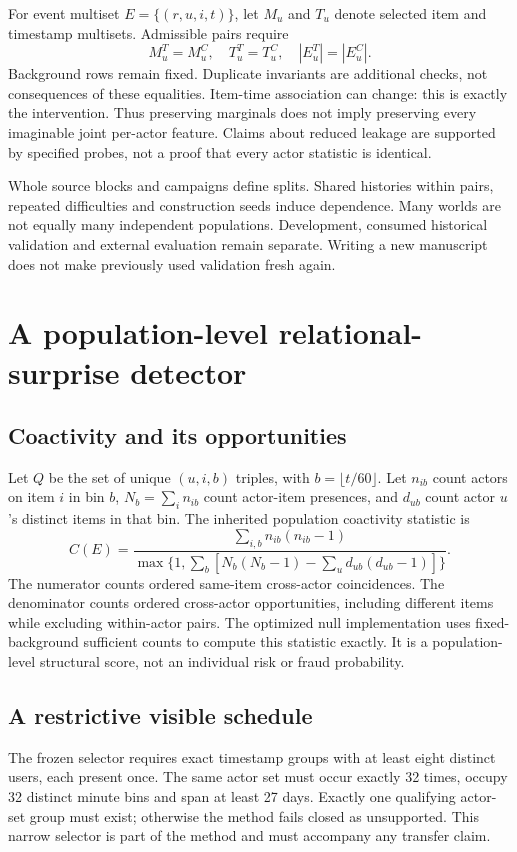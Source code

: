 \documentclass[11pt,letterpaper]{article}
\begin{document}
For event multiset $E=\{(r,u,i,t)\}$, let $M_u$ and $T_u$ denote selected item and timestamp multisets. Admissible pairs require
\begin{equation}
M_u^{T}=M_u^{C},\quad T_u^{T}=T_u^{C},\quad |E_u^{T}|=|E_u^{C}|.
\end{equation}
Background rows remain fixed. Duplicate invariants are additional checks, not consequences of these equalities. Item-time association can change: this is exactly the intervention. Thus preserving marginals does not imply preserving every imaginable joint per-actor feature. Claims about reduced leakage are supported by specified probes, not a proof that every actor statistic is identical.

Whole source blocks and campaigns define splits. Shared histories within pairs, repeated difficulties and construction seeds induce dependence. Many worlds are not equally many independent populations. Development, consumed historical validation and external evaluation remain separate. Writing a new manuscript does not make previously used validation fresh again.

\section{A population-level relational-surprise detector}
\subsection{Coactivity and its opportunities}
Let $Q$ be the set of unique $(u,i,b)$ triples, with $b=\lfloor t/60\rfloor$. Let $n_{ib}$ count actors on item $i$ in bin $b$, $N_b=\sum_i n_{ib}$ count actor-item presences, and $d_{ub}$ count actor $u$'s distinct items in that bin. The inherited population coactivity statistic is
\begin{equation}
C(E)=\frac{\sum_{i,b}n_{ib}(n_{ib}-1)}{\max\{1,\sum_b[N_b(N_b-1)-\sum_u d_{ub}(d_{ub}-1)]\}}.
\label{eq:coactivity}
\end{equation}
The numerator counts ordered same-item cross-actor coincidences. The denominator counts ordered cross-actor opportunities, including different items while excluding within-actor pairs. The optimized null implementation uses fixed-background sufficient counts to compute this statistic exactly. It is a population-level structural score, not an individual risk or fraud probability.

\subsection{A restrictive visible schedule}
The frozen selector requires exact timestamp groups with at least eight distinct users, each present once. The same actor set must occur exactly 32 times, occupy 32 distinct minute bins and span at least 27 days. Exactly one qualifying actor-set group must exist; otherwise the method fails closed as unsupported. This narrow selector is part of the method and must accompany any transfer claim.
\end{document}
